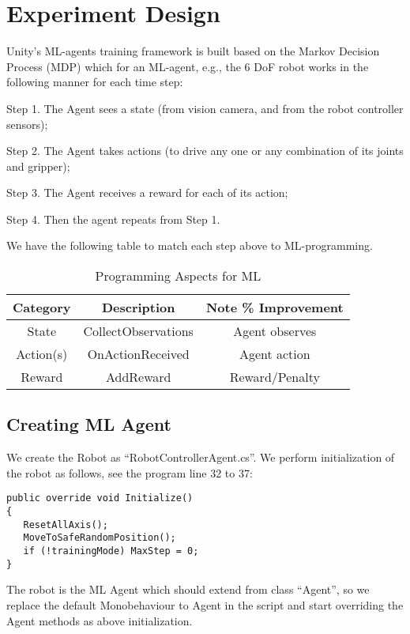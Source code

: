 \documentclass[conference]{IEEEtran}
\begin{document}
\section{Experiment Design}
Unity’s ML-agents training framework is built based on 
the Markov Decision Process (MDP) which for an ML-agent, 
e.g., the 6 DoF robot works in the following manner for
each time step: 

Step 1. The Agent sees a state (from vision camera, and from 
the robot controller sensors); 

Step 2. The Agent takes actions (to drive any one or any 
combination of its joints and gripper); 

Step 3. The Agent receives a reward for each of its action; 

Step 4. Then the agent repeats from Step 1. 

We have the 
following table to match each step above to ML-programming.
\begin{table}[H] %
\renewcommand{\arraystretch}{1.3} 
\caption{Programming Aspects for ML}
\label{state-Table1}
\centering 
\begin{tabular}{|c||c||c|}
\hline
Category     & Description    & Note    \% Improvement \\
\hline
\hline
State & CollectObservations & Agent observes \\
\hline
Action(s) & OnActionReceived & Agent action \\
\hline
Reward & AddReward & Reward/Penalty \\
\hline
\hline 
\end{tabular}
\end{table}

\subsection{Creating ML Agent}
 
We create the Robot as 
“RobotControllerAgent.cs”. 
We perform initialization of 
the robot as follows, see the program line 32 to 37: 

\begin{verbatim}
public override void Initialize()
{
   ResetAllAxis();
   MoveToSafeRandomPosition();
   if (!trainingMode) MaxStep = 0;
}
\end{verbatim}

The robot is the ML Agent which 
should extend from class “Agent”, so we replace the default 
Monobehaviour to Agent in the script and start overriding the 
Agent methods as above initialization. 
\end{document}
